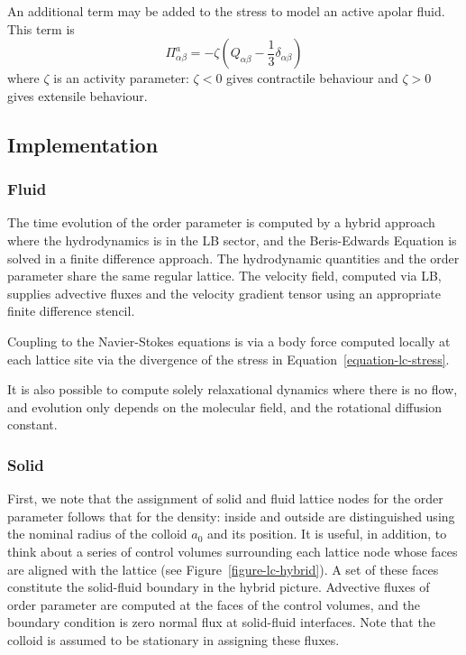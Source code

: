 An additional term may be added to the stress to model an active
apolar fluid. This term is
\begin{equation}
\Pi_{\alpha\beta}^a = -\zeta
(Q_{\alpha\beta} - {\textstyle\frac{1}{3}}\delta_{\alpha\beta})
\end{equation}
where $\zeta$ is an activity parameter: $\zeta < 0$ gives
contractile behaviour and $\zeta > 0$ gives extensile behaviour.

\subsection{Implementation}

\subsubsection{Fluid}

The time evolution of the order parameter is computed by a hybrid
approach where the hydrodynamics is in the LB sector, and the
Beris-Edwards Equation is solved in a finite difference approach.
The hydrodynamic quantities and the order parameter share the same
regular lattice. The velocity field, computed via LB, supplies
advective fluxes and the velocity gradient tensor using an appropriate
finite difference stencil.

Coupling to the Navier-Stokes equations is via a body force computed
locally at each lattice site via the divergence of the stress in
Equation~\ref{equation-lc-stress}.

It is also possible to compute solely relaxational dynamics where there
is no flow, and evolution only depends on the molecular field, and the
rotational diffusion constant.


\subsubsection{Solid}

First, we note that the assignment of solid and fluid lattice
nodes for the order parameter follows that for the density:
inside and outside are distinguished using the nominal radius
of the colloid $a_0$ and its position. It is useful, in addition,
to think about a series of control volumes surrounding each lattice
node whose faces are aligned with the lattice
(see Figure~\ref{figure-lc-hybrid}). A set of these
faces constitute the solid-fluid boundary in the hybrid picture.
Advective fluxes of order parameter are computed at the faces
of the control volumes, and the boundary condition is zero
normal flux at solid-fluid interfaces. Note that the colloid
is assumed to be stationary in assigning these fluxes.


